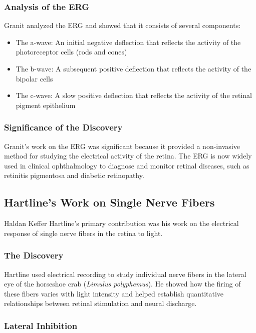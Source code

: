 \subsubsection{Analysis of the ERG}

Granit analyzed the ERG and showed that it consists of several components:

\begin{itemize}
\item The a-wave: An initial negative deflection that reflects the activity of the photoreceptor cells (rods and cones)
\item The b-wave: A subsequent positive deflection that reflects the activity of the bipolar cells
\item The c-wave: A slow positive deflection that reflects the activity of the retinal pigment epithelium
\end{itemize}

\subsubsection{Significance of the Discovery}

Granit's work on the ERG was significant because it provided a non-invasive method for studying the electrical activity of the retina. The ERG is now widely used in clinical ophthalmology to diagnose and monitor retinal diseases, such as retinitis pigmentosa and diabetic retinopathy.

\subsection{Hartline's Work on Single Nerve Fibers}

Haldan Keffer Hartline's primary contribution was his work on the electrical response of single nerve fibers in the retina to light.

\subsubsection{The Discovery}

Hartline used electrical recording to study individual nerve fibers in the lateral eye of the horseshoe crab (\textit{Limulus polyphemus}). He showed how the firing of these fibers varies with light intensity and helped establish quantitative relationships between retinal stimulation and neural discharge.

\subsubsection{Lateral Inhibition}

